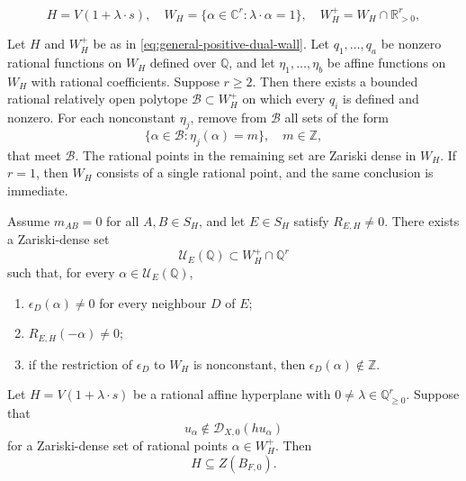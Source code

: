 \documentclass[10pt,a4paper]{amsart}
\newcommand{\C}{\mathbb C}
\newcommand{\D}{\mathscr D}
\newcommand{\Q}{\mathbb Q}
\newcommand{\R}{\mathbb R}
\newcommand{\Z}{\mathbb Z}
\begin{document}
\begin{equation}\label{eq:general-positive-dual-wall}
 H=V(1+\lambda\cdot s), \quad W_H=\{\alpha\in\C^r:\lambda\cdot\alpha=1\}, \quad W_H^+=W_H\cap\R_{>0}^r,
\end{equation}

\begin{lemma}\label{lem:bounded-polytope-density}
Let $H$ and $W_H^+$ be as in \eqref{eq:general-positive-dual-wall}. Let $q_1,\ldots,q_a$ be nonzero rational functions on $W_H$ defined over $\Q$, and let $\eta_1,\ldots,\eta_b$ be affine functions on $W_H$ with rational coefficients. Suppose $r\ge2$. Then there exists a bounded rational relatively open polytope $\mathcal B\subset W_H^+$ on which every $q_i$ is defined and nonzero. For each nonconstant $\eta_j$, remove from $\mathcal B$ all sets of the form
\begin{equation*}
\{\alpha\in\mathcal B:\eta_j(\alpha)=m\},\quad m\in\Z,
\end{equation*}
that meet $\mathcal B$. The rational points in the remaining set are Zariski dense in $W_H$.
If $r=1$, then $W_H$ consists of a single rational point, and the same conclusion is immediate.
\end{lemma}

\begin{lemma}\label{lem:selected-rupture-density}
Assume $m_{AB}=0$ for all $A,B\in S_H$, and let $E\in S_H$ satisfy $R_{E,H}\neq0$. There exists a Zariski-dense set
\begin{equation*}
\mathcal U_E(\Q)\subset W_H^+\cap\Q^r
\end{equation*}
such that, for every $\alpha\in\mathcal U_E(\Q)$,
\begin{enumerate}[label=\textup{(\roman*)}]
\item $\epsilon_D(\alpha)\neq0$ for every neighbour $D$ of $E$;
\item $R_{E,H}(-\alpha)\neq0$;
\item if the restriction of $\epsilon_D$ to $W_H$ is nonconstant, then $\epsilon_D(\alpha)\notin\Z$.
\end{enumerate}
\end{lemma}

\begin{theorem}\label{thm:dense-wall-lifting}
Let $H=V(1+\lambda\cdot s)$ be a rational affine hyperplane with $0\ne\lambda\in\Q_{\ge0}^r$. Suppose that
\[
 u_\alpha\notin\D_{X,0}(hu_\alpha)
\]
for a Zariski-dense set of rational points $\alpha\in W_H^+$. Then
\begin{equation}\label{eq:whole-bernstein-wall}
 H\subseteq Z(B_{F,0}).
\end{equation}
\end{theorem}
\end{document}
